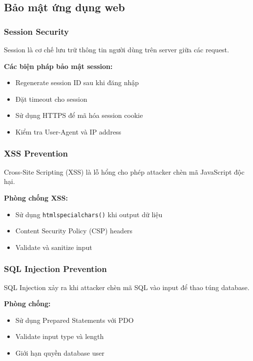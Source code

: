 \subsection{Bảo mật ứng dụng web}

\subsubsection{Session Security}

Session là cơ chế lưu trữ thông tin người dùng trên server giữa các request.

\textbf{Các biện pháp bảo mật session:}
\begin{itemize}
    \item Regenerate session ID sau khi đăng nhập
    \item Đặt timeout cho session
    \item Sử dụng HTTPS để mã hóa session cookie
    \item Kiểm tra User-Agent và IP address
\end{itemize}

\subsubsection{XSS Prevention}

Cross-Site Scripting (XSS) là lỗ hổng cho phép attacker chèn mã JavaScript độc hại.

\textbf{Phòng chống XSS:}
\begin{itemize}
    \item Sử dụng \texttt{htmlspecialchars()} khi output dữ liệu
    \item Content Security Policy (CSP) headers
    \item Validate và sanitize input
\end{itemize}

\subsubsection{SQL Injection Prevention}

SQL Injection xảy ra khi attacker chèn mã SQL vào input để thao túng database.

\textbf{Phòng chống:}
\begin{itemize}
    \item Sử dụng Prepared Statements với PDO
    \item Validate input type và length
    \item Giới hạn quyền database user
\end{itemize}

